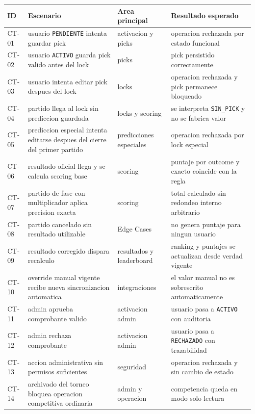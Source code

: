 \begin{longtable}{p{}p{}p{}p{}}
\toprule
\textbf{ID} & \textbf{Escenario} & \textbf{Area principal} & \textbf{Resultado esperado} \\
\midrule
CT-01 & usuario \texttt{PENDIENTE} intenta guardar pick & activacion y picks & operacion rechazada por estado funcional \\
CT-02 & usuario \texttt{ACTIVO} guarda pick valido antes del lock & picks & pick persistido correctamente \\
CT-03 & usuario intenta editar pick despues del lock & locks & operacion rechazada y pick permanece bloqueado \\
CT-04 & partido llega al lock sin prediccion guardada & locks y scoring & se interpreta \texttt{SIN\_PICK} y no se fabrica valor \\
CT-05 & prediccion especial intenta editarse despues del cierre del primer partido & predicciones especiales & operacion rechazada por lock especial \\
CT-06 & resultado oficial llega y se calcula scoring base & scoring & puntaje por outcome y exacto coincide con la regla \\
CT-07 & partido de fase con multiplicador aplica precision exacta & scoring & total calculado sin redondeo interno arbitrario \\
CT-08 & partido cancelado sin resultado utilizable & Edge Cases & no genera puntaje para ningun usuario \\
CT-09 & resultado corregido dispara recalculo & resultados y leaderboard & ranking y puntajes se actualizan desde verdad vigente \\
CT-10 & override manual vigente recibe nueva sincronizacion automatica & integraciones & el valor manual no es sobrescrito automaticamente \\
CT-11 & admin aprueba comprobante valido & activacion admin & usuario pasa a \texttt{ACTIVO} con auditoria \\
CT-12 & admin rechaza comprobante & activacion admin & usuario pasa a \texttt{RECHAZADO} con trazabilidad \\
CT-13 & accion administrativa sin permisos suficientes & seguridad & operacion rechazada y sin cambio de estado \\
CT-14 & archivado del torneo bloquea operacion competitiva ordinaria & admin y operacion & competencia queda en modo solo lectura \\
\bottomrule
\end{longtable}


